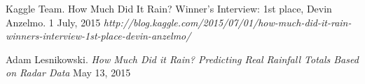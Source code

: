 \documentclass[11pt]{article}
\begin{document}
\begin{thebibliography}{99}

 Kaggle Team. How Much Did It Rain? Winner's Interview: 1st place, Devin Anzelmo. 1 July, 2015 {\textit{http://blog.kaggle.com/2015/07/01/how-much-did-it-rain-winners-interview-1st-place-devin-anzelmo/}}  

 Adam Lesnikowski. \textit{How Much Did it Rain? Predicting Real Rainfall Totals Based on Radar Data } May 13, 2015

\end{thebibliography}
\end{document}
